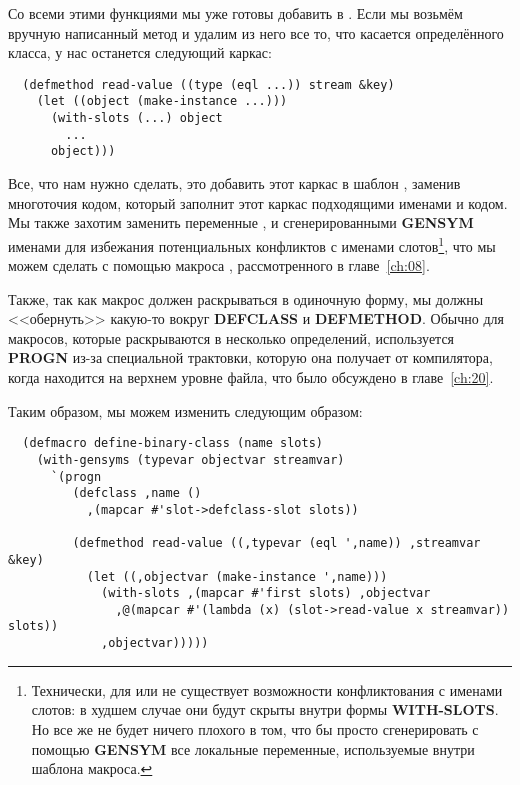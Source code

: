 Со всеми этими функциями мы уже готовы добавить  в
. Если мы возьмём вручную написанный метод  и
удалим из него все то, что касается определённого класса, у нас останется следующий
каркас:

\begin{lstlisting}
  (defmethod read-value ((type (eql ...)) stream &key)
    (let ((object (make-instance ...)))
      (with-slots (...) object
        ...
      object)))
\end{lstlisting}

Все, что нам нужно сделать, это добавить этот каркас в шаблон ,
заменив многоточия кодом, который заполнит этот каркас подходящими именами и кодом. Мы
также захотим заменить переменные ,  и 
сгенерированными \textbf{GENSYM} именами для избежания потенциальных конфликтов с именами
слотов\footnote{Технически, для  или  не существует возможности
  конфликтования с именами слотов: в худшем случае они будут скрыты внутри формы
  \textbf{WITH-SLOTS}. Но все же не будет ничего плохого в том, что бы просто
  сгенерировать с помощью \textbf{GENSYM} все локальные переменные, используемые внутри
  шаблона макроса.}, что мы можем сделать с помощью макроса ,
рассмотренного в главе~\ref{ch:08}.

Также, так как макрос должен раскрываться в одиночную форму, мы должны <<обернуть>>
какую-то вокруг \textbf{DEFCLASS} и \textbf{DEFMETHOD}. Обычно для макросов, которые
раскрываются в несколько определений, используется \textbf{PROGN} из-за специальной
трактовки, которую она получает от компилятора, когда находится на верхнем уровне файла,
что было обсуждено в главе~\ref{ch:20}.

Таким образом, мы можем изменить  следующим образом:

\begin{lstlisting}
  (defmacro define-binary-class (name slots)
    (with-gensyms (typevar objectvar streamvar)
      `(progn
         (defclass ,name ()
           ,(mapcar #'slot->defclass-slot slots))

         (defmethod read-value ((,typevar (eql ',name)) ,streamvar &key)
           (let ((,objectvar (make-instance ',name)))
             (with-slots ,(mapcar #'first slots) ,objectvar
               ,@(mapcar #'(lambda (x) (slot->read-value x streamvar)) slots))
             ,objectvar)))))
\end{lstlisting}

